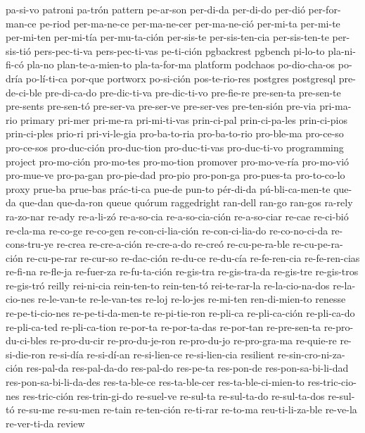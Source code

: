 {  pa-si-vo patroni pa-trón pattern pe-ar-son per-di-da per-di-do
  per-dió per-for-man-ce pe-riod per-ma-ne-ce per-ma-ne-cer
  per-ma-ne-ció per-mi-ta per-mi-te per-mi-ten per-mi-tía
  per-mu-ta-ción per-sis-te per-sis-ten-cia per-sis-ten-te per-sis-tió
  pers-pec-ti-va pers-pec-ti-vas pe-ti-ción pgbackrest pgbench pi-lo-to
  pla-ni-fi-có pla-no plan-te-a-mien-to pla-ta-for-ma platform podchaos
  po-dio-cha-os po-dría po-lí-ti-ca por-que portworx po-si-ción
  pos-te-rio-res postgres postgresql pre-de-ci-ble pre-di-ca-do
  pre-dic-ti-va pre-dic-ti-vo pre-fie-re pre-sen-ta pre-sen-te
  pre-sents pre-sen-tó pre-ser-va pre-ser-ve pre-ser-ves pre-ten-sión
  pre-via pri-ma-rio primary pri-mer pri-me-ra pri-mi-ti-vas
  prin-ci-pal prin-ci-pa-les prin-ci-pios prin-ci-ples prio-ri
  pri-vi-le-gia pro-ba-to-ria pro-ba-to-rio pro-ble-ma pro-ce-so
  pro-ce-sos pro-duc-ción pro-duc-tion pro-duc-ti-vas pro-duc-ti-vo
  programming project pro-mo-ción pro-mo-tes pro-mo-tion promover
  pro-mo-ve-ría pro-mo-vió pro-mue-ve pro-pa-gan pro-pie-dad pro-pio
  pro-pon-ga pro-pues-ta pro-to-co-lo proxy prue-ba prue-bas prác-ti-ca
  pue-de pun-to pér-di-da pú-bli-ca-men-te que-da que-dan que-da-ron
  queue quórum raggedright ran-dell ran-go ran-gos ra-rely ra-zo-nar
  re-ady re-a-li-zó re-a-so-cia re-a-so-cia-ción re-a-so-ciar re-cae
  re-ci-bió re-cla-ma re-co-ge re-co-gen re-con-ci-lia-ción
  re-con-ci-lia-do re-co-no-ci-da re-cons-tru-ye re-crea re-cre-a-ción
  re-cre-a-do re-creó re-cu-pe-ra-ble re-cu-pe-ra-ción re-cu-pe-rar
  re-cur-so re-dac-ción re-du-ce re-du-cía re-fe-ren-cia re-fe-ren-cias
  re-fi-na re-fle-ja re-fuer-za re-fu-ta-ción re-gis-tra re-gis-tra-da
  re-gis-tre re-gis-tros re-gis-tró reilly rei-ni-cia rein-ten-to
  rein-ten-tó rei-te-rar-la re-la-cio-na-dos re-la-cio-nes re-le-van-te
  re-le-van-tes re-loj re-lo-jes re-mi-ten ren-di-mien-to renesse
  re-pe-ti-cio-nes re-pe-ti-da-men-te re-pi-tie-ron re-pli-ca
  re-pli-ca-ción re-pli-ca-do re-pli-ca-ted re-pli-ca-tion re-por-ta
  re-por-ta-das re-por-tan re-pre-sen-ta re-pro-du-ci-bles
  re-pro-du-cir re-pro-du-je-ron re-pro-du-jo re-pro-gra-ma re-quie-re
  re-si-die-ron re-si-día re-si-dí-an re-si-lien-ce re-si-lien-cia
  resilient re-sin-cro-ni-za-ción res-pal-da res-pal-da-do res-pal-do
  res-pe-ta res-pon-de res-pon-sa-bi-li-dad res-pon-sa-bi-li-da-des
  res-ta-ble-ce res-ta-ble-cer res-ta-ble-ci-mien-to res-tric-cio-nes
  res-tric-ción res-trin-gi-do re-suel-ve re-sul-ta re-sul-ta-do
  re-sul-ta-dos re-sul-tó re-su-me re-su-men re-tain re-ten-ción
  re-ti-rar re-to-ma reu-ti-li-za-ble re-ve-la re-ver-ti-da review
}
